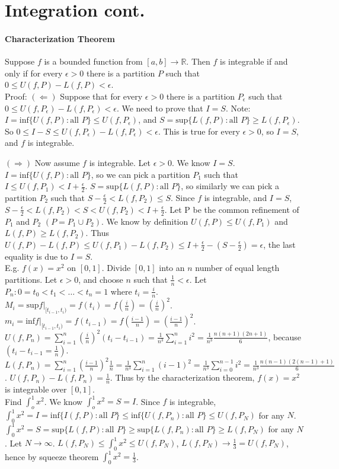 \documentclass[10pt,letter]{article}
\begin{document}
\section*{Integration cont.}

\paragraph{Characterization Theorem}
Suppose $f$ is a bounded function from $[a,b]\rightarrow\mathbb{R}$. Then $f$ is integrable if and only if for every $\epsilon>0$ there is a partition $P$ such that $0\leq U(f,P)-L(f,P)<\epsilon$.\\ 
Proof: $(\Leftarrow)$ Suppose that for every $\epsilon>0$ there is a partition $P_\epsilon$ such that $0\leq U(f,P_\epsilon)-L(f,P_\epsilon)<\epsilon$. We need to prove that $I=S$. Note: $I=\text{inf}\{U(f,P):\text{all }P\}\leq U(f,P_\epsilon)$, and $S=\text{sup}\{L(f,P):\text{all }P\}\geq L(f,P_\epsilon)$. So $0\leq I-S\leq U(f,P_\epsilon)-L(f,P_\epsilon)<\epsilon$. This is true for every $\epsilon>0$, so $I=S$, and $f$ is integrable. 

$(\Rightarrow)$ Now assume $f$ is integrable. Let $\epsilon>0$. We know $I=S$.  $I=\text{inf}\{U(f,P):\text{all }P\}$, so we can pick a partition $P_1$ such that $I\leq U(f,P_1)<I+\frac{\epsilon}{2}$. $S=\text{sup}\{L(f,P):\text{all }P\}$, so similarly we can pick a partition $P_2$ such that $S-\frac{\epsilon}{2}<L(f,P_2)\leq S$. Since $f$ is integrable, and $I=S$, $S-\frac{\epsilon}{2}<L(f,P_2)<S<U(f,P_2)<I+\frac{\epsilon}{2}$. Let P be the common refinement of $P_1$ and $P_2$ $(P = P_1\cup P_2)$. We know by definition $U(f,P)\leq U(f,P_1)$ and $L(f,P)\geq L(f,P_2)$. Thus $U(f,P)-L(f,P)\leq U(f,P_1)-L(f,P_2)\leq I+\frac{\epsilon}{2}-(S-\frac{\epsilon}{2})=\epsilon$, the last equality is due to $I=S$. \\ 

E.g. $f(x)=x^2$ on $[0,1]$. Divide $[0,1]$ into an $n$ number of equal length partitions. Let $\epsilon>0$, and choose $n$ such that $\frac{1}{n}<\epsilon$. Let $P_n:0=t_0<t_1<\ldots<t_n=1$ where $t_i=\frac{i}{n}$. $M_i=\text{sup}f|_{[t_{i-1},t_i)}=f(t_i)=f(\frac{i}{n})=(\frac{i}{n})^2$. $m_i=\text{inf}f|_{[t_{i-1},t_i)}=f(t_{i-1})=f(\frac{i-1}{n})=(\frac{i-1}{n})^2$. $U(f,P_n)=\sum_{i=1}^n(\frac{i}{n})^2(t_i-t_{i-1})=\frac{1}{n^3}\sum_{i=1}^ni^2=\frac{1}{n^3}\frac{n(n+1)(2n+1)}{6}$, because $(t_i-t_{i-1}=\frac{1}{n})$. $L(f,P_n)=\sum_{i=1}^n(\frac{i-1}{n})^2\frac{1}{n}=\frac{1}{n^3}\sum_{i=1}^n(i-1)^2=\frac{1}{n^3}\sum_{i=0}^{n-1}i^2=\frac{1}{n^3}\frac{n(n-1)(2(n-1)+1)}{6}$. $U(f,P_n)-L(f,P_n) = \frac{1}{n}$. Thus by the characterization theorem, $f(x)=x^2$ is integrable over $[0,1]$.  \\ 
Find $\int_o^1x^2$. We know $\int_o^1x^2=S=I$. Since $f$ is integrable, $\int_0^1x^2=I=\text{inf}\{I(f,P): \text{all }P\}\leq\text{inf}\{U(f,P_n): \text{all }P\}\leq U(f,P_N)$ for any $N$. $\int_0^1x^2=S=\text{sup}\{L(f,P): \text{all }P\}\geq\text{sup}\{L(f,P_n): \text{all }P\}\geq L(f,P_N)$ for any $N$. Let $N\rightarrow\infty$. $L(f,P_N)\leq\int_0^1x^2\leq U(f,P_N)$, $L(f,P_N)\rightarrow\frac{1}{3}=U(f,P_N)$, hence by squeeze theorem $\int_0^1x^2=\frac{1}{3}$. 
\end{document}
